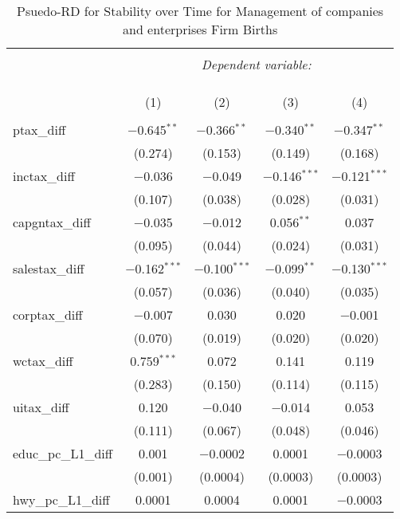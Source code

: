 
\begin{table}[!htbp] \centering 
  \caption{Psuedo-RD for Stability over Time for  Management of companies and enterprises Firm Births} 
  \label{} 
\begin{tabular}{@{\extracolsep{5pt}}lcccc} 
\\[-1.8ex]\hline 
\hline \\[-1.8ex] 
 & \multicolumn{4}{c}{\textit{Dependent variable:}} \\ 
\cline{2-5} 
\\[-1.8ex] & \multicolumn{4}{c}{ } \\ 
\\[-1.8ex] & (1) & (2) & (3) & (4)\\ 
\hline \\[-1.8ex] 
 ptax\_diff & $-$0.645$^{**}$ & $-$0.366$^{**}$ & $-$0.340$^{**}$ & $-$0.347$^{**}$ \\ 
  & (0.274) & (0.153) & (0.149) & (0.168) \\ 
  inctax\_diff & $-$0.036 & $-$0.049 & $-$0.146$^{***}$ & $-$0.121$^{***}$ \\ 
  & (0.107) & (0.038) & (0.028) & (0.031) \\ 
  capgntax\_diff & $-$0.035 & $-$0.012 & 0.056$^{**}$ & 0.037 \\ 
  & (0.095) & (0.044) & (0.024) & (0.031) \\ 
  salestax\_diff & $-$0.162$^{***}$ & $-$0.100$^{***}$ & $-$0.099$^{**}$ & $-$0.130$^{***}$ \\ 
  & (0.057) & (0.036) & (0.040) & (0.035) \\ 
  corptax\_diff & $-$0.007 & 0.030 & 0.020 & $-$0.001 \\ 
  & (0.070) & (0.019) & (0.020) & (0.020) \\ 
  wctax\_diff & 0.759$^{***}$ & 0.072 & 0.141 & 0.119 \\ 
  & (0.283) & (0.150) & (0.114) & (0.115) \\ 
  uitax\_diff & 0.120 & $-$0.040 & $-$0.014 & 0.053 \\ 
  & (0.111) & (0.067) & (0.048) & (0.046) \\ 
  educ\_pc\_L1\_diff & 0.001 & $-$0.0002 & 0.0001 & $-$0.0003 \\ 
  & (0.001) & (0.0004) & (0.0003) & (0.0003) \\ 
  hwy\_pc\_L1\_diff & 0.0001 & 0.0004 & 0.0001 & $-$0.0003 \\ 

\end{tabular}
\end{table}
